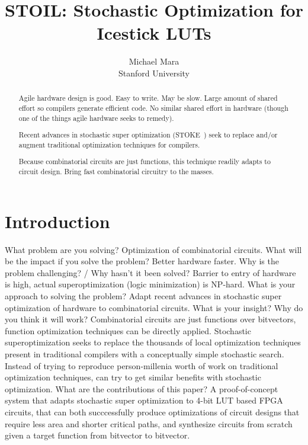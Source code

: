 \documentclass{article}
\begin{document}
\title{STOIL: Stochastic Optimization for Icestick LUTs}

\author
       {Michael Mara\\Stanford University}



\maketitle

\begin{abstract}
\small
Agile hardware design is good.
Easy to write.
May be slow.
Large amount of shared effort so compilers generate efficient code.
No similar shared effort in hardware (though one of the things agile hardware seeks to remedy).

Recent advances in stochastic super optimization (STOKE~\cite{schkufza2013stochastic,stoke16}) seek to replace and/or augment traditional optimization techniques for compilers.

Because combinatorial circuits are just functions, this technique readily adapts to circuit design.
Bring fast combinatorial circuitry to the masses.
\end{abstract}


\section{Introduction}
What problem are you solving? Optimization of combinatorial circuits.
What will be the impact if you solve the problem? Better hardware faster.
Why is the problem challenging? / Why hasn't it been solved? Barrier to entry of hardware is high, actual superoptimization (logic minimization)\cite{Micheli1994} is NP-hard.
What is your approach to solving the problem? Adapt recent advances in stochastic super optimization of hardware to combinatorial circuits.
What is your insight? Why do you think it will work? Combinatorial circuits are just functions over bitvectors, function optimization techniques can be directly applied. Stochastic superoptimization seeks to replace the thousands of local optimization techniques present in traditional compilers with a conceptually simple stochastic search. Instead of trying to reproduce person-millenia worth of work on traditional optimization techniques, can try to get similar benefits with stochastic optimization.
What are the contributions of this paper? A proof-of-concept system that adapts stochastic super optimization to 4-bit LUT based FPGA circuits, that can both succcessfully produce optimizations of circuit designs that require less area and shorter critical paths, and synthesize circuits from scratch given a target function from bitvector to bitvector.
\end{document}
